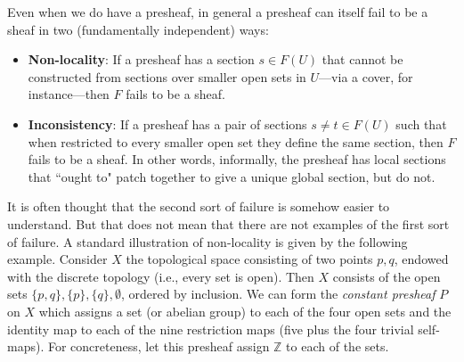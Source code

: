 \documentclass[a4paper]{book}
\theoremstyle{definition}
\theoremstyle{definition}
\theoremstyle{definition}
\theoremstyle{theorem}
\theoremstyle{definition}
\begin{document}
\par    
Even when we do have a presheaf, in general a presheaf can itself fail to be a sheaf in two (fundamentally independent) ways:  
\begin{itemize}
	\item \textbf{Non-locality}: If a presheaf has a section $s \in F(U)$ that cannot be constructed from sections over smaller open sets in $U$---via a cover, for instance---then $F$ fails to be a sheaf. 
	\item \textbf{Inconsistency}: If a presheaf has a pair of sections $s \neq t \in F(U)$ such that when restricted to every smaller open set they define the same section, then $F$ fails to be a sheaf. In other words, informally, the presheaf has local sections that ``ought to" patch together to give a unique global section, but do not.  
\end{itemize}
It is often thought that the second sort of failure is somehow easier to understand. But that does not mean that there are not examples of the first sort of failure. A standard illustration of non-locality is given by the following example. Consider $X$ the topological space consisting of two points $p, q$, endowed with the discrete topology (i.e., every set is open). Then $X$ consists of the open sets $\{p,q\}, \{p\}, \{q\}, \emptyset$, ordered by inclusion. We can form the \textit{constant presheaf} $P$ on $X$ which assigns a set (or abelian group) to each of the four open sets and the identity map to each of the nine restriction maps (five plus the four trivial self-maps). For concreteness, let this presheaf assign $\mathbb{Z}$ to each of the sets.     
\begin{center} 
\end{center} 
\end{document}
